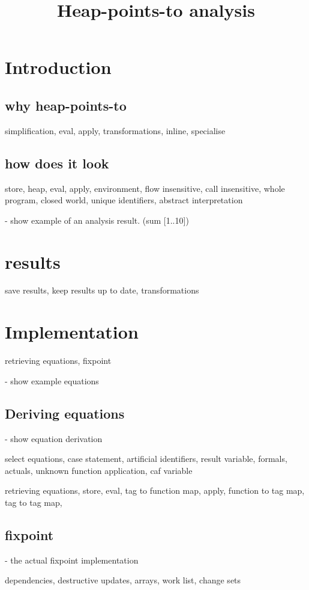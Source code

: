 \documentclass{article}
\title{Heap-points-to analysis}
\begin{document}
\section{Introduction}

\subsection{why heap-points-to}

simplification, eval, apply, transformations, inline, specialise

\subsection{how does it look}

store, heap, eval, apply, environment, flow insensitive, call insensitive,
whole program, closed world, unique identifiers, abstract interpretation

- show example of an analysis result. (sum [1..10])

\section{results}

save results, keep results up to date, transformations

\section{Implementation}

retrieving equations, fixpoint

- show example equations

\subsection{Deriving equations}

- show equation derivation

select equations, case statement, artificial identifiers, result variable,
formals, actuals, unknown function application, caf variable

retrieving equations, store, eval, tag to function map, apply, function to tag
map, tag to tag map,

\subsection{fixpoint}

- the actual fixpoint implementation

dependencies, destructive updates, arrays, work list, change sets




\end{document}
